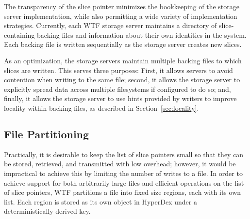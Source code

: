\documentclass[twocolumn,10pt,letterpaper]{article}
\begin{document}
The transparency of the slice pointer minimizes the bookkeeping of the storage
server implementation, while also permitting a wide variety of implementation
strategies.  Currently, each WTF storage server maintains a directory of
slice-containing backing files and information about their own identities in the
system.  Each backing file is written sequentially as the storage server creates
new slices.

As an optimization, the storage servers maintain multiple backing files to which
slices are written.  This serves three purposes:  First, it allows servers to
avoid contention when writing to the same file; second, it allows the storage
server to explicitly spread data across multiple filesystems if configured to do
so; and, finally, it allows the storage server to use hints provided by writers
to improve locality within backing files, as described in
Section~\ref{sec:locality}.

\subsection{File Partitioning}

Practically, it is desirable to keep the list of slice pointers small so that they
can be stored, retrieved, and transmitted with low overhead; however, it would
be impractical to achieve this by limiting the number of writes to a file.  In
order to achieve support for both arbitrarily large files and efficient
operations on the list of slice pointers, WTF partitions a file into fixed size
regions, each with its own list.  Each region is stored as its own object in
HyperDex under a deterministically derived key.
\end{document}
